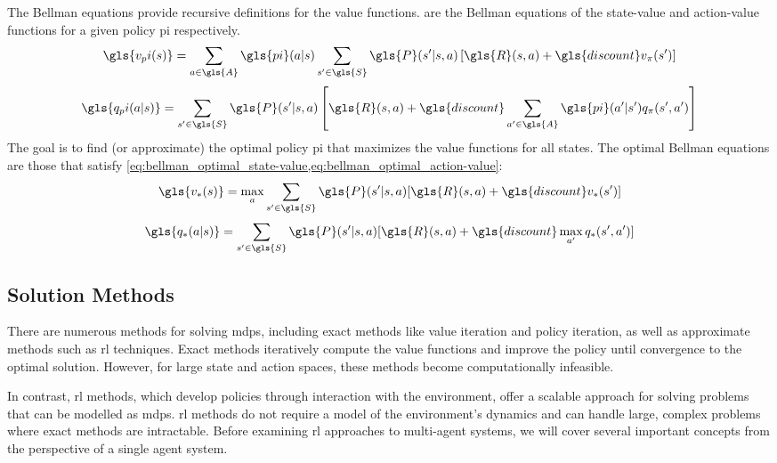 The Bellman equations provide recursive definitions for the value functions. 
 are the Bellman equations
of the state-value and action-value functions for a given policy \gls{pi} 
respectively.
\begin{equation}
    \gls{v_pi(s)} 
    = \sum_{a \in \gls{A}} \gls{pi}(a|s) 
      \sum_{s^\prime \in \gls{S}} \gls{P}(s^\prime|s, a) \left[
        \gls{R}(s, a) + \gls{discount} v_\pi(s^\prime)\right]
    \label{eq:bellman_state-value}
\end{equation} \begin{equation}
    \gls{q_pi(a|s)} 
    = \sum_{s^\prime \in \gls{S}} \gls{P}(s^\prime|s, a) \left[
        \gls{R}(s, a) + \gls{discount} \sum_{a^\prime \in \gls{A}} 
        \gls{pi}(a^\prime|s^\prime) q_\pi(s^\prime, a^\prime)\right]
    \label{eq:bellman_action-value} 
    \vspace*{1em}
\end{equation}
The goal is to find (or approximate) the optimal policy \gls{pi} that maximizes
the value functions for all states. The optimal Bellman equations are those that
satisfy \cref*{eq:bellman_optimal_state-value,eq:bellman_optimal_action-value}:
\begin{equation}
    \gls{v_*(s)} = \max_a \sum_{s^\prime \in \gls{S}} \gls{P}(s^\prime|s, a)
    [\gls{R}(s, a) + \gls{discount} v_*(s^\prime)]
    \label{eq:bellman_optimal_state-value}
\end{equation} \begin{equation}
    \gls{q_*(a|s)} = \sum_{s^\prime \in \gls{S}} \gls{P}(s^\prime|s, a) 
    [\gls{R}(s, a) + \gls{discount} \max_{a^\prime} q_*(s^\prime, a^\prime)]
    \label{eq:bellman_optimal_action-value}
\end{equation}

    \subsection*{Solution Methods}%

There are numerous methods for solving \glspl{mdp}, including exact methods 
like value iteration and policy iteration, as well as approximate methods 
such as \gls{rl} techniques. Exact methods iteratively compute the value 
functions and improve the policy until convergence to the optimal solution. 
However, for large state and action spaces, 
these methods become computationally infeasible.

In contrast, \gls{rl} methods, which develop policies through interaction
with the environment, offer a scalable approach for solving problems that
can be modelled as \glspl{mdp}. 
\Gls{rl} methods do not require a model of the environment's dynamics and can
handle large, complex problems where exact methods are intractable.
Before examining \gls{rl} approaches to multi-agent systems, we will cover 
several important concepts from the perspective of a single agent system.

